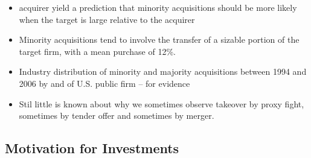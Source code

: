 \documentclass[12pt]{article}
\begin{document}
\begin{itemize}
        \item acquirer yield a prediction that minority acquisitions should be more likely when the target is large relative to the acquirer \citep{Ouimet2013}

        \item Minority acquisitions tend to involve the transfer of a sizable portion of the target firm, with a mean purchase of 12\%. \citep{Ouimet2013}

        \item Industry distribution of minority and majority acquisitions between 1994 and 2006 by and of U.S. public firm \citep{Ouimet2013} -- for evidence

        \item Stil little is known about why we sometimes observe takeover by proxy fight, sometimes by tender offer and sometimes by merger. \citep{Harris1988}
    \end{itemize}

\subsection{Motivation for Investments}
\end{document}
